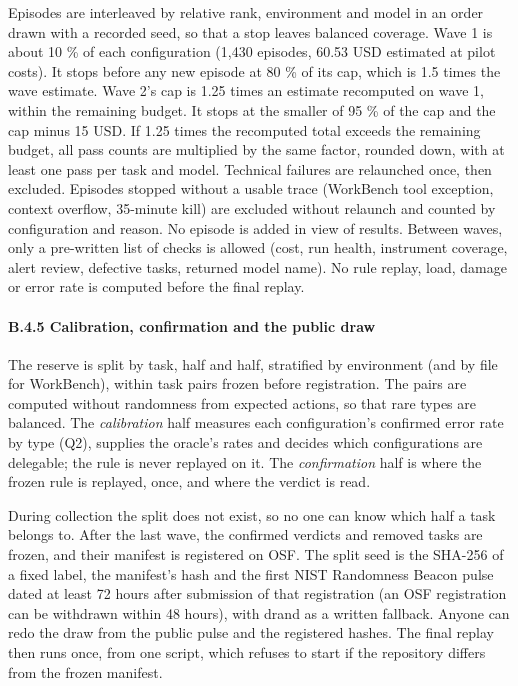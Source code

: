Episodes are interleaved by relative rank, environment and model in an order drawn with a recorded seed, so that a stop leaves balanced coverage. Wave 1 is about 10 \% of each configuration (1,430 episodes, 60.53 USD estimated at pilot costs). It stops before any new episode at 80 \% of its cap, which is 1.5 times the wave estimate. Wave 2's cap is 1.25 times an estimate recomputed on wave 1, within the remaining budget. It stops at the smaller of 95 \% of the cap and the cap minus 15 USD. If 1.25 times the recomputed total exceeds the remaining budget, all pass counts are multiplied by the same factor, rounded down, with at least one pass per task and model. Technical failures are relaunched once, then excluded. Episodes stopped without a usable trace (WorkBench tool exception, context overflow, 35-minute kill) are excluded without relaunch and counted by configuration and reason. No episode is added in view of results. Between waves, only a pre-written list of checks is allowed (cost, run health, instrument coverage, alert review, defective tasks, returned model name). No rule replay, load, damage or error rate is computed before the final replay.

\paragraph{B.4.5 Calibration, confirmation and the public draw}\label{b.4.5-calibration-confirmation-and-the-public-draw}

The reserve is split by task, half and half, stratified by environment (and by file for WorkBench), within task pairs frozen before registration. The pairs are computed without randomness from expected actions, so that rare types are balanced. The \emph{calibration} half measures each configuration's confirmed error rate by type (Q2), supplies the oracle's rates and decides which configurations are delegable; the rule is never replayed on it. The \emph{confirmation} half is where the frozen rule is replayed, once, and where the verdict is read.

During collection the split does not exist, so no one can know which half a task belongs to. After the last wave, the confirmed verdicts and removed tasks are frozen, and their manifest is registered on OSF. The split seed is the SHA-256 of a fixed label, the manifest's hash and the first NIST Randomness Beacon pulse dated at least 72 hours after submission of that registration (an OSF registration can be withdrawn within 48 hours), with drand as a written fallback. Anyone can redo the draw from the public pulse and the registered hashes. The final replay then runs once, from one script, which refuses to start if the repository differs from the frozen manifest.

